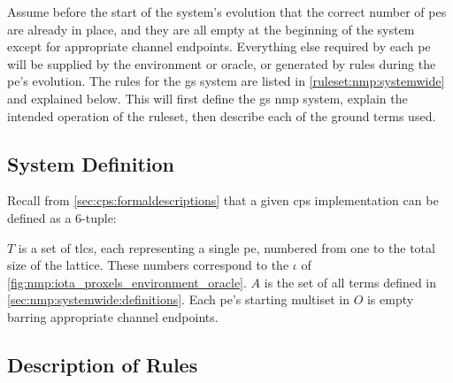 Assume before the start of the system's evolution that the correct number of \glspl{pe} are already in place, and they are all empty at the beginning of the system except for appropriate channel endpoints.  Everything else required by each \gls{pe} will be supplied by the environment or oracle, or generated by rules during the \gls{pe}'s evolution.  The rules for the \gls{gs} system are listed in \cref{ruleset:nmp:systemwide} and explained below.  This  will first define the \gls{gs} \gls{nmp} system, explain the intended operation of the \gls{ruleset}, then describe each of the ground terms used.

\subsection{System Definition}
Recall from \cref{sec:cps:formaldescriptions} that a given \gls{cps} implementation can be defined as a 6-tuple:


\(T\) is a set of \glspl{tlc}, each representing a single \gls{pe}, numbered from one to the total size of the lattice.  These numbers correspond to the \(\iota\) of \cref{fig:nmp:iota_proxels_environment_oracle}.  \(A\) is the set of all terms defined in \cref{sec:nmp:systemwide:definitions}.  Each \gls{pe}'s starting multiset in \(O\) is empty barring appropriate channel endpoints.

\subsection{\label{sec:nmp:systemwide:rulesdesc}Description of Rules}

